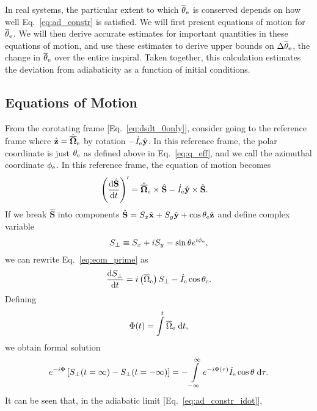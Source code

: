 \documentclass[
        fleqn,
        usenatbib,
    ]{mnras}
\newcommand*{\rd}[2]{\frac{\mathrm{d}#1}{\mathrm{d}#2}}
\newcommand*{\bm}[1]{\boldsymbol{\mathbf{#1}}}
\newcommand*{\uv}[1]{\hat{\bm{#1}}}
\newcommand*{\p}[1]{\left(#1\right)}
\newcommand*{\s}[1]{\left[#1\right]}
\begin{document}
In real systems, the particular extent to which $\overline{\theta}_{\rm e}$ is
conserved depends on how well Eq.~\eqref{eq:ad_constr} is satisfied. We will
first present equations of motion for $\overline{\theta}_{\rm e}$. We will then
derive accurate estimates for important quantities in these equations of motion,
and use these estimates to derive upper bounds on $\Delta \overline{\theta}_{\rm
e}$, the change in $\overline{\theta}_{\rm e}$ over the entire inspiral. Taken
together, this calculation estimates the deviation from adiabaticity as a
function of initial conditions.

\subsection{Equations of Motion}

From the corotating frame [Eq.~\eqref{eq:dsdt_0only}], consider going to the
reference frame where $\uv{z} = \uv{\overline{\Omega}}_{\rm e} $ by rotation
$-\dot{I}_{\rm e}\uv{y}$. In this reference frame, the polar coordinate is just
$\theta_{\rm e}$ as defined above in Eq.~\eqref{eq:q_eff}, and we call the
azimuthal coordinate $\phi_{\rm e}$. In this reference frame, the equation of
motion becomes
\begin{align}
    \p{\rd{\uv{S}}{t}}' &= \uv{\overline{\Omega}}_{\rm e} \times \uv{S}
        - \dot{I}_{\rm e} \uv{y} \times \uv{S}\label{eq:eom_prime}.
\end{align}
If we break $\uv{S}$ into components $\uv{S} = S_x\uv{x} + S_y \uv{y} + \cos
\theta_{\rm e} \uv{z}$ and define complex variable
\begin{equation}
    S_\perp \equiv S_x + iS_y = \sin\theta e^{i\phi_{\rm e}},
\end{equation}
we can rewrite Eq.~\ref{eq:eom_prime} as
\begin{equation}
    \rd{S_\perp}{t} = i\p{\overline{\Omega}_{\rm e}} S_\perp
        - \dot{I}_{\rm e} \cos \theta_{\rm e}.
\end{equation}
Defining
\begin{equation}
    \Phi(t) = \int\limits^t \overline{\Omega}_{\rm e}\;\mathrm{d}t,
\end{equation}
we obtain formal solution
\begin{equation}
    e^{-i\Phi}\s{S_{\perp}(t = \infty) - S_{\perp}(t = -\infty)}
        = -\int\limits_{-\infty}^\infty
            e^{-i\Phi(\tau)}\dot{I}_{\rm e} \cos \theta\;\mathrm{d}\tau.
\end{equation}
It can be seen that, in the adiabatic limit [Eq.~\eqref{eq:ad_constr_idot}],
\end{document}
